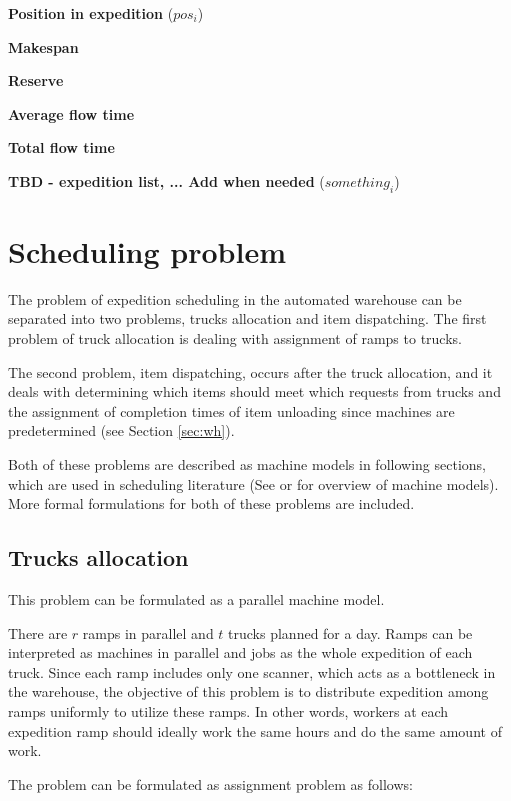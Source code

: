 \documentclass{ctuthesis}
\begin{document}
\noindent \textbf{Position in expedition} ($pos_i$)

\noindent \textbf{Makespan}

\noindent \textbf{Reserve}

\noindent \textbf{Average flow time}

\noindent \textbf{Total flow time}

\noindent \textbf{TBD - expedition list, ... Add when needed} ($something_i$)


\section{Scheduling problem}
 
 The problem of expedition scheduling in the automated warehouse can be separated into two problems, trucks allocation and item dispatching. The first problem of truck allocation is dealing with assignment of ramps to trucks.
 
 The second problem, item dispatching, occurs after the truck allocation, and it deals with determining which items should meet which requests from trucks and the assignment of completion times of item unloading since machines are predetermined (see Section \ref{sec:wh}).
 
Both of these problems are described as machine models in following sections, which are used in scheduling literature (See \cite{pinedo} or \cite{bucker} for overview of machine models). More formal formulations for both of these problems are included.
 
 \subsection{Trucks allocation}
 \label{subsec:truckallocation}
This problem can be formulated as a parallel machine model.
 
 There are $r$ ramps in parallel and $t$ trucks planned for a day. Ramps can be interpreted as machines in parallel and jobs as the whole expedition of each truck. Since each ramp includes only one scanner, which acts as a bottleneck in the warehouse, the objective of this problem is to distribute expedition among ramps uniformly to utilize these ramps. In other words, workers at each expedition ramp should ideally work the same hours and do the same amount of work.
 
 The problem can be formulated as assignment problem as follows:
 
\end{document}
